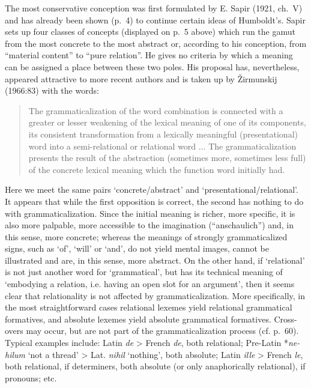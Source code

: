 The most conservative conception was first formulated by E. Sapir (1921, ch.~V) and has already been shown (p.~4) to continue certain ideas of Humboldt's. Sapir sets up four classes of concepts (displayed on p.~5 above) which run the gamut from the most concrete to the most abstract or, according to his conception, from “material content” to “pure relation”. He gives no criteria by which a meaning can be assigned a place between these two poles. His proposal has, nevertheless, appeared attractive to more recent authors and is taken up by Žirmunskij (1966:83) with the words:

\begin{quotation}
The grammaticalization of the word combination is connected with a greater or lesser weakening of the lexical meaning of one of its components, its consistent transformation from a lexically meaningful (presentational) word into a semi-relational or relational word ... The grammaticalization presents the result of the abstraction (sometimes more, sometimes less full) of the concrete lexical meaning which the function word initially had.
\end{quotation}

Here we meet the same pairs ‘concrete/abstract’ and ‘presentational/relational’. It appears that while the first opposition is correct, the second has nothing to do with grammaticalization. Since the initial meaning is richer, more specific, it is also more palpable, more accessible to the imagination (“anschaulich”) and, in this sense, more concrete; whereas the meanings of strongly grammaticalized signs, such as ‘of’, ‘will’ or ‘and’, do not yield mental images, cannot be illustrated and are, in this sense, more abstract. On the other hand, if ‘relational’ is not just another word for ‘grammatical’, but has its technical meaning of ‘embodying a relation, i.e. having an open slot for an argument’, then it seems clear that relationality is not affected by grammaticalization. More specifically, in the most straightforward cases relational lexemes yield relational grammatical formatives, and absolute lexemes yield absolute grammatical formatives. Cross-overs may occur, but are not part of the grammaticalization process (cf. p.~60). Typical examples include: Latin \textit{de} {\textgreater} French \textit{de}, both relational; Pre-Latin *\textit{ne-hilum} ‘not a thread’ {\textgreater} Lat. \textit{nihil} ‘nothing’, both absolute; Latin \textit{ille} {\textgreater} French \textit{le}, both relational, if determiners, both absolute (or only anaphorically relational), if pronouns; etc.

